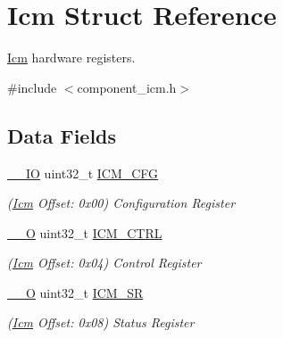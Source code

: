 \hypertarget{structIcm}{}\section{Icm Struct Reference}
\label{structIcm}


\mbox{\hyperlink{structIcm}{Icm}} hardware registers.  




{\ttfamily \#include $<$component\+\_\+icm.\+h$>$}

\subsection*{Data Fields}
\begin{DoxyCompactItemize}
\item 
\mbox{\label{structIcm_a42f6c1d3c45b22401f6346004540d461}} 
\mbox{\hyperlink{core__cm7_8h_aec43007d9998a0a0e01faede4133d6be}{\+\_\+\+\_\+\+IO}} uint32\+\_\+t \mbox{\hyperlink{structIcm_a42f6c1d3c45b22401f6346004540d461}{I\+C\+M\+\_\+\+C\+FG}}
\begin{DoxyCompactList}\small\item\em (\mbox{\hyperlink{structIcm}{Icm}} Offset\+: 0x00) Configuration Register \end{DoxyCompactList}\item 
\mbox{\label{structIcm_aabb9961e474021e890fe7ee4494d2cbf}} 
\mbox{\hyperlink{core__cm7_8h_a7e25d9380f9ef903923964322e71f2f6}{\+\_\+\+\_\+O}} uint32\+\_\+t \mbox{\hyperlink{structIcm_aabb9961e474021e890fe7ee4494d2cbf}{I\+C\+M\+\_\+\+C\+T\+RL}}
\begin{DoxyCompactList}\small\item\em (\mbox{\hyperlink{structIcm}{Icm}} Offset\+: 0x04) Control Register \end{DoxyCompactList}\item 
\mbox{\label{structIcm_aea53ec12b94dd8948deb581174dec991}} 
\mbox{\hyperlink{core__cm7_8h_a7e25d9380f9ef903923964322e71f2f6}{\+\_\+\+\_\+O}} uint32\+\_\+t \mbox{\hyperlink{structIcm_aea53ec12b94dd8948deb581174dec991}{I\+C\+M\+\_\+\+SR}}
\begin{DoxyCompactList}\small\item\em (\mbox{\hyperlink{structIcm}{Icm}} Offset\+: 0x08) Status Register \end{DoxyCompactList}\item 

\end{DoxyCompactItemize}
